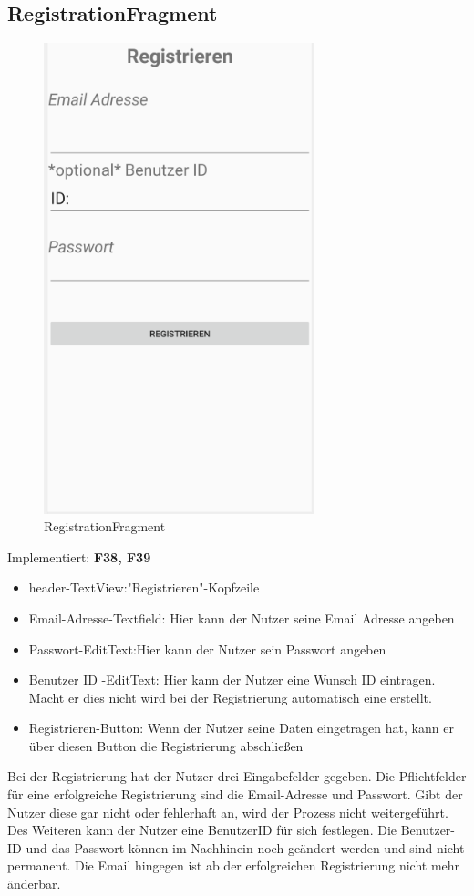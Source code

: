 \subsection{RegistrationFragment}
\begin{figure}[H]
	\centering
	\includegraphics[width=0.7\textwidth]{pics/registrationFragment.png}%
	\caption{RegistrationFragment}%
	\label{view}%
\end{figure}
Implementiert: \textbf{F38, F39}
\begin{itemize}[nosep]
	\item header-TextView:"Registrieren"-Kopfzeile
	\item Email-Adresse-Textfield: Hier kann der Nutzer seine Email Adresse angeben
	\item Passwort-EditText:Hier kann der Nutzer sein Passwort angeben
	\item Benutzer ID -EditText: Hier kann der Nutzer eine Wunsch ID eintragen. Macht er dies nicht wird bei der Registrierung automatisch eine erstellt. 
	\item Registrieren-Button: Wenn der Nutzer seine Daten eingetragen hat, kann er über diesen Button die Registrierung abschließen
\end{itemize}
Bei der Registrierung hat der Nutzer drei Eingabefelder gegeben. Die Pflichtfelder für eine erfolgreiche Registrierung sind die Email-Adresse und  Passwort. Gibt der Nutzer diese gar nicht oder fehlerhaft an, wird der Prozess nicht weitergeführt. Des Weiteren kann der Nutzer eine BenutzerID für sich festlegen. Die Benutzer-ID und das Passwort können im Nachhinein noch geändert werden und sind nicht permanent. Die Email hingegen ist ab der erfolgreichen Registrierung nicht mehr änderbar.

